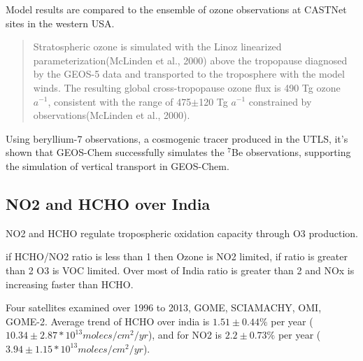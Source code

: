 Model results are compared to the ensemble of ozone observations at CASTNet sites in the western USA.

\begin{quote}
Stratospheric ozone is simulated with the Linoz linearized parameterization(McLinden et al., 2000) above the tropopause diagnosed by the GEOS-5 data and transported to the troposphere with the model winds. The resulting global cross-tropopause ozone flux is 490 Tg ozone $a^{−1}$, consistent with the range of 475$\pm$120 Tg $a^{−1}$ constrained by observations(McLinden et al., 2000).
\end{quote}

Using beryllium-7 observations, a cosmogenic tracer produced in the UTLS, it's shown that GEOS-Chem successfully simulates the $^7$Be observations, supporting the simulation of vertical transport in GEOS-Chem.

  
\subsection{NO2 and HCHO over India \cite{Mahajan_2015}}
NO2 and HCHO regulate tropospheric oxidation capacity through O3 production. 

if HCHO/NO2 ratio is less than 1 then Ozone is NO2 limited, if ratio is greater than 2 O3 is VOC limited.
Over most of India ratio is greater than 2 and NOx is increasing faster than HCHO.

Four satellites examined over 1996 to 2013, GOME, SCIAMACHY, OMI, GOME-2.
Average trend of HCHO over india is $1.51 \pm 0.44\%$ per year ($10.34 \pm 2.87 *10^{13} molecs/cm^2/yr$), and for NO2 is $2.2 \pm 0.73\%$ per year ($3.94 \pm 1.15 *10^{13} molecs/cm^2/yr$).
  
  